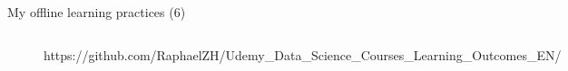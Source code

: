 \documentclass{beamer}
\begin{document}
\begin{frame}[fragile]{My offline learning practices (6)}
\begin{figure}[!htb]
			\endminipage\hfill
			\vspace{.2em}
			\begin{columns}
				\normalfont\footnotesize{https://github.com/RaphaelZH/Udemy\_Data\_Science\_Courses\_Learning\_Outcomes\_EN/}
			\end{columns}
		\end{figure}
	\end{frame}
	
	\backmatter
\end{document}
